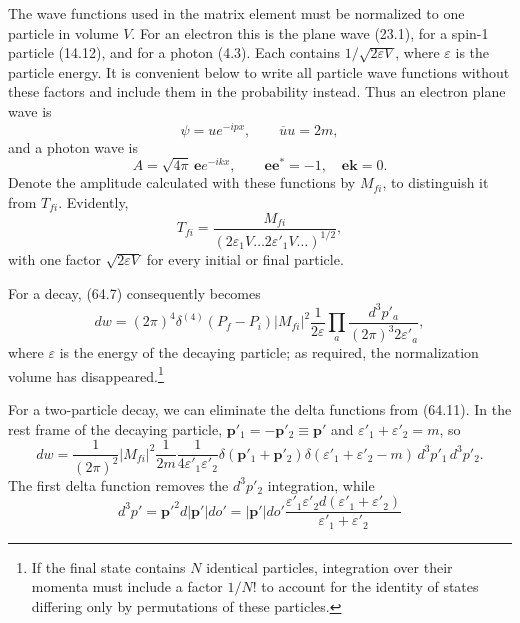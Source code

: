 The wave functions used in the matrix element must be normalized to one particle in volume $V$. For an electron this is the plane wave (23.1), for a spin-1 particle (14.12), and for a photon (4.3). Each contains $1/\sqrt{2\varepsilon V}$, where $\varepsilon$ is the particle energy. It is convenient below to write all particle wave functions without these factors and include them in the probability instead. Thus an electron plane wave is
\begin{equation}
\psi=ue^{-ipx},\qquad \overline uu=2m,
\tag{64.8}
\end{equation}
and a photon wave is
\begin{equation}
A=\sqrt{4\pi}\,\mathbf e e^{-ikx},\qquad \mathbf e\mathbf e^*=-1,\quad \mathbf e\mathbf k=0.
\tag{64.9}
\end{equation}
Denote the amplitude calculated with these functions by $M_{fi}$, to distinguish it from $T_{fi}$. Evidently,
\begin{equation}
T_{fi}=\frac{M_{fi}}{(2\varepsilon_1V\ldots 2\varepsilon'_1V\ldots)^{1/2}},
\tag{64.10}
\end{equation}
with one factor $\sqrt{2\varepsilon V}$ for every initial or final particle.

For a decay, (64.7) consequently becomes
\begin{equation}
dw=(2\pi)^4\delta^{(4)}(P_f-P_i)|M_{fi}|^2\frac1{2\varepsilon}
\prod_a\frac{d^3p'_a}{(2\pi)^3 2\varepsilon'_a},
\tag{64.11}
\end{equation}
where $\varepsilon$ is the energy of the decaying particle; as required, the normalization volume has disappeared.\footnote{If the final state contains $N$ identical particles, integration over their momenta must include a factor $1/N!$ to account for the identity of states differing only by permutations of these particles.}

For a two-particle decay, we can eliminate the delta functions from (64.11). In the rest frame of the decaying particle, $\mathbf p'_1=-\mathbf p'_2\equiv\mathbf p'$ and $\varepsilon'_1+\varepsilon'_2=m$, so
\[
dw=\frac1{(2\pi)^2}|M_{fi}|^2\frac1{2m}\frac1{4\varepsilon'_1\varepsilon'_2}
\delta(\mathbf p'_1+\mathbf p'_2)\delta(\varepsilon'_1+\varepsilon'_2-m)\,d^3p'_1\,d^3p'_2.
\]
The first delta function removes the $d^3p'_2$ integration, while
\begin{equation}
d^3p'=\mathbf p'^2d|\mathbf p'|do'=|\mathbf p'|do'
\frac{\varepsilon'_1\varepsilon'_2d(\varepsilon'_1+\varepsilon'_2)}{\varepsilon'_1+\varepsilon'_2}
\tag{64.12}
\end{equation}

